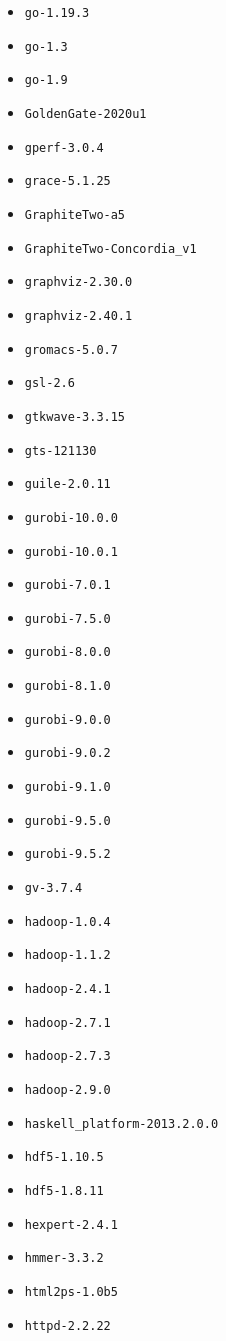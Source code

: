 \begin{multicols}{3}
\begin{itemize}
\item \verb|go-1.19.3|
\item \verb|go-1.3|
\item \verb|go-1.9|
\item \verb|GoldenGate-2020u1|
\item \verb|gperf-3.0.4|
\item \verb|grace-5.1.25|
\item \verb|GraphiteTwo-a5|
\item \verb|GraphiteTwo-Concordia_v1|
\item \verb|graphviz-2.30.0|
\item \verb|graphviz-2.40.1|
\item \verb|gromacs-5.0.7|
\item \verb|gsl-2.6|
\item \verb|gtkwave-3.3.15|
\item \verb|gts-121130|
\item \verb|guile-2.0.11|
\item \verb|gurobi-10.0.0|
\item \verb|gurobi-10.0.1|
\item \verb|gurobi-7.0.1|
\item \verb|gurobi-7.5.0|
\item \verb|gurobi-8.0.0|
\item \verb|gurobi-8.1.0|
\item \verb|gurobi-9.0.0|
\item \verb|gurobi-9.0.2|
\item \verb|gurobi-9.1.0|
\item \verb|gurobi-9.5.0|
\item \verb|gurobi-9.5.2|
\item \verb|gv-3.7.4|
\item \verb|hadoop-1.0.4|
\item \verb|hadoop-1.1.2|
\item \verb|hadoop-2.4.1|
\item \verb|hadoop-2.7.1|
\item \verb|hadoop-2.7.3|
\item \verb|hadoop-2.9.0|
\item \verb|haskell_platform-2013.2.0.0|
\item \verb|hdf5-1.10.5|
\item \verb|hdf5-1.8.11|
\item \verb|hexpert-2.4.1|
\item \verb|hmmer-3.3.2|
\item \verb|html2ps-1.0b5|
\item \verb|httpd-2.2.22|

\end{itemize}
\end{multicols}
